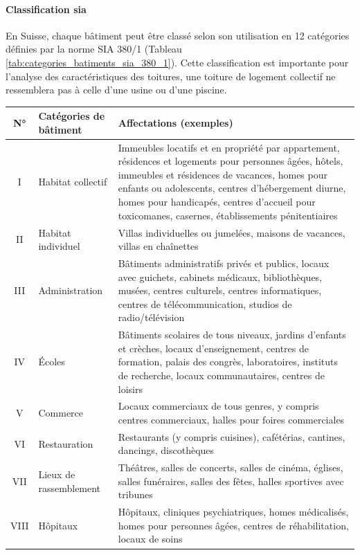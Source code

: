 \paragraph{Classification \gls{sia}}
En Suisse, chaque bâtiment peut être classé selon son utilisation en 12 catégories définies par la norme SIA 380/1 \cite{sia_sia-shop_nodate} (Tableau \ref{tab:categories_batiments_sia_380_1}). Cette classification est importante pour l'analyse des caractéristiques des toitures, une toiture de logement collectif ne ressemblera pas à celle d'une usine ou d'une piscine.

\begin{table}[H]
    \centering
    \begin{tabular}{@{}clp{}@{}}
    \toprule
    \textbf{N°} & \textbf{Catégories de bâtiment} & \textbf{Affectations (exemples)} \\
    \midrule
    I & Habitat collectif & Immeubles locatifs et en propriété par appartement, résidences et logements pour personnes âgées, hôtels, immeubles et résidences de vacances, homes pour enfants ou adolescents, centres d'hébergement diurne, homes pour handicapés, centres d'accueil pour toxicomanes, casernes, établissements pénitentiaires \\
    II & Habitat individuel & Villas individuelles ou jumelées, maisons de vacances, villas en chaînettes \\
    III & Administration & Bâtiments administratifs privés et publics, locaux avec guichets, cabinets médicaux, bibliothèques, musées, centres culturels, centres informatiques, centres de télécommunication, studios de radio/télévision \\
    IV & Écoles & Bâtiments scolaires de tous niveaux, jardins d'enfants et crèches, locaux d'enseignement, centres de formation, palais des congrès, laboratoires, instituts de recherche, locaux communautaires, centres de loisirs \\
    V & Commerce & Locaux commerciaux de tous genres, y compris centres commerciaux, halles pour foires commerciales \\
    VI & Restauration & Restaurants (y compris cuisines), cafétérias, cantines, dancings, discothèques \\
    VII & Lieux de rassemblement & Théâtres, salles de concerts, salles de cinéma, églises, salles funéraires, salles des fêtes, halles sportives avec tribunes \\
    VIII & Hôpitaux & Hôpitaux, cliniques psychiatriques, homes médicalisés, homes pour personnes âgées, centres de réhabilitation, locaux de soins \\

\end{tabular}
\end{table}
